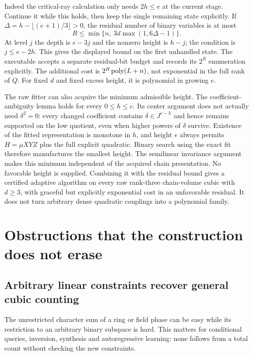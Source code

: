 Indeed the critical-ray calculation only needs $2h\le e$ at the current
stage. Continue it while this holds, then keep the single remaining
state explicitly. If
$\Delta=h-\lfloor(e+1)/3\rfloor>0$, the residual number of binary
variables is at most
\[
 R\le\min\{n,\ 3d\max(1,6\Delta-1)\}.
\]
At level $j$ the depth is $e-3j$ and the nonzero height is $h-j$;
the condition is $j\le e-2h$. This gives the displayed bound on the
first unhandled state. The executable accepts a separate residual-bit
budget and records its $2^R$ enumeration explicitly. The additional
cost is $2^R\operatorname{poly}(L+n)$, not exponential in the full rank of $Q$.
For fixed $d$ and fixed excess height, it is polynomial in growing $e$.

The raw fitter can also acquire the minimum admissible height. The
coefficient-ambiguity lemma holds for every $0\le h\le e$. Its center
argument does not actually need $\delta^2=0$: every changed coefficient
contains $\delta\in J^{e-h}$ and hence remains supported on the low
quotient, even when higher powers of $\delta$ survive.
Existence of the fitted representation is monotone in $h$, and height
$e$ always permits $H=\mu XYZ$ plus the full explicit quadratic.
Binary search using the exact fit therefore manufactures the smallest
height. The semilinear invariance argument makes this minimum independent
of the acquired chain presentation. No favorable height is
supplied. Combining it with the residual bound gives a certified
adaptive algorithm on every raw rank-three chain-volume cubic with
$d\ge3$, with graceful but explicitly exponential cost in an unfavorable
residual. It does not turn arbitrary dense quadratic couplings into a
polynomial family.

\section{Obstructions that the construction does not erase}
\subsection{Arbitrary linear constraints recover general cubic counting}\label{sec:parityboundary}
The unrestricted character sum of a ring or field phase can be easy while
its restriction to an arbitrary binary subspace is hard. This matters for
conditional queries, inversion, synthesis and autoregressive learning:
none follows from a total count without checking the new constraints.

